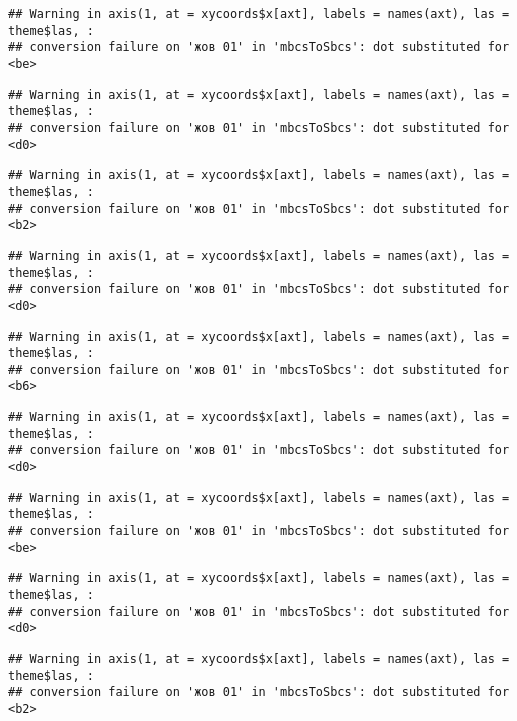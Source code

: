 \documentclass[]{article}
\begin{document}
\begin{verbatim}
## Warning in axis(1, at = xycoords$x[axt], labels = names(axt), las = theme$las, :
## conversion failure on 'жов 01' in 'mbcsToSbcs': dot substituted for <be>
\end{verbatim}

\begin{verbatim}
## Warning in axis(1, at = xycoords$x[axt], labels = names(axt), las = theme$las, :
## conversion failure on 'жов 01' in 'mbcsToSbcs': dot substituted for <d0>
\end{verbatim}

\begin{verbatim}
## Warning in axis(1, at = xycoords$x[axt], labels = names(axt), las = theme$las, :
## conversion failure on 'жов 01' in 'mbcsToSbcs': dot substituted for <b2>
\end{verbatim}

\begin{verbatim}
## Warning in axis(1, at = xycoords$x[axt], labels = names(axt), las = theme$las, :
## conversion failure on 'жов 01' in 'mbcsToSbcs': dot substituted for <d0>
\end{verbatim}

\begin{verbatim}
## Warning in axis(1, at = xycoords$x[axt], labels = names(axt), las = theme$las, :
## conversion failure on 'жов 01' in 'mbcsToSbcs': dot substituted for <b6>
\end{verbatim}

\begin{verbatim}
## Warning in axis(1, at = xycoords$x[axt], labels = names(axt), las = theme$las, :
## conversion failure on 'жов 01' in 'mbcsToSbcs': dot substituted for <d0>
\end{verbatim}

\begin{verbatim}
## Warning in axis(1, at = xycoords$x[axt], labels = names(axt), las = theme$las, :
## conversion failure on 'жов 01' in 'mbcsToSbcs': dot substituted for <be>
\end{verbatim}

\begin{verbatim}
## Warning in axis(1, at = xycoords$x[axt], labels = names(axt), las = theme$las, :
## conversion failure on 'жов 01' in 'mbcsToSbcs': dot substituted for <d0>
\end{verbatim}

\begin{verbatim}
## Warning in axis(1, at = xycoords$x[axt], labels = names(axt), las = theme$las, :
## conversion failure on 'жов 01' in 'mbcsToSbcs': dot substituted for <b2>
\end{verbatim}
\end{document}
